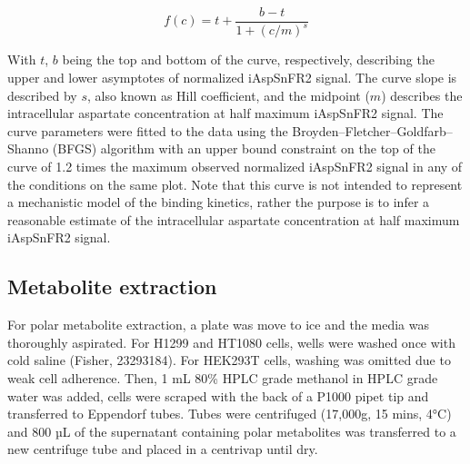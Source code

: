 \documentclass[9pt,lineno]{elife}
\begin{document}
$$
f(c) = t + \frac{b - t}{1 + (c/m)^s}
$$

With $t$, $b$ being the top and bottom of the curve, respectively, describing the upper and lower asymptotes of normalized iAspSnFR2 signal.
The curve slope is described by $s$, also known as Hill coefficient, and the midpoint ($m$) describes the intracellular aspartate concentration at half maximum iAspSnFR2 signal.
The curve parameters were fitted to the data using the Broyden–Fletcher–Goldfarb–Shanno (BFGS) algorithm with an upper bound constraint on the top of the curve of 1.2 times the maximum observed normalized iAspSnFR2 signal in any of the conditions on the same plot.
Note that this curve is not intended to represent a mechanistic model of the binding kinetics, rather the purpose is to infer a reasonable estimate of the intracellular aspartate concentration at half maximum iAspSnFR2 signal.

\subsection{Metabolite extraction}
For polar metabolite extraction, a plate was move to ice and the media was thoroughly aspirated.
For H1299 and HT1080 cells, wells were washed once with cold saline (Fisher, 23293184).
For HEK293T cells, washing was omitted due to weak cell adherence.
Then, 1 mL 80\% HPLC grade methanol in HPLC grade water was added, cells were scraped with the back of a P1000 pipet tip and transferred to Eppendorf tubes.
Tubes were centrifuged (17,000g, 15 mins, 4°C) and 800 µL of the supernatant containing polar metabolites was transferred to a new centrifuge tube and placed in a centrivap until dry.
\end{document}
